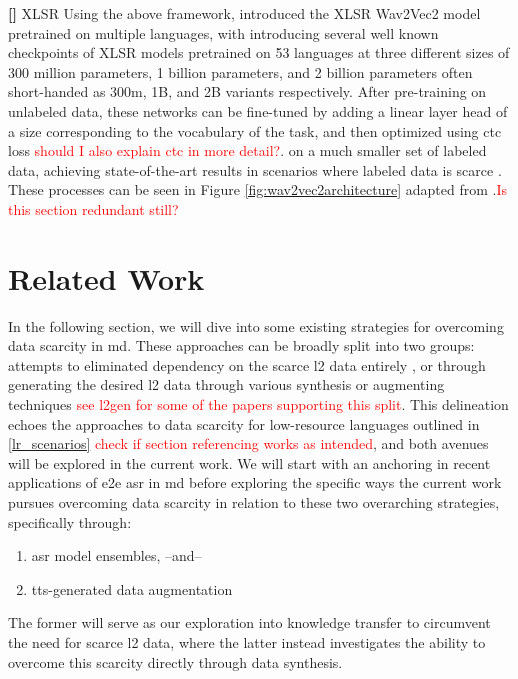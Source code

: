\documentclass[thesis]{cluu}
\newcounter{paranum}
\newcommand{\numberedparagraph}{\par\refstepcounter{paranum}\textbf{[\theparanum] }}
\newcommand{\todo}[1]{\textcolor{red}{#1}}
\begin{document}
\numberedparagraph{XLSR}
Using the above framework, \textcite{conneauUnsupervisedCrosslingualRepresentation2020} introduced the XLSR Wav2Vec2 model pretrained on multiple languages, with \textcite{babuXLSRSelfsupervisedCrosslingual2021} introducing several well known checkpoints of XLSR models pretrained on 53 languages at three different sizes of 300 million parameters, 1 billion parameters, and 2 billion parameters often short-handed as 300m, 1B, and 2B variants respectively. After pre-training on unlabeled data, these networks can be fine-tuned by adding a linear layer head of a size corresponding to the vocabulary of the task, and then optimized using \gls{ctc} loss \parencite{gravesConnectionistTemporalClassification} \todo{should I also explain ctc in more detail?}. on a much smaller set of labeled data, achieving state-of-the-art results in scenarios where labeled data is scarce \textcite{baevskiWav2vec20Framework2020a}. These processes can be seen in Figure \ref{fig:wav2vec2architecture} adapted from \textcite{babuXLSRSelfsupervisedCrosslingual2021}.\todo{Is this section redundant still?}


\chapter{Related Work}\label{ch:rw}
In the following section, we will dive into some existing strategies for overcoming data scarcity in \gls{md}. These approaches can be broadly split into two groups: attempts to eliminated dependency on the scarce \gls{l2} data entirely \parencite{korzekwaWeaklysupervisedWordlevelPronunciation2021}, or through generating the desired \gls{l2} data through various synthesis or augmenting techniques \todo{see l2gen for some of the papers supporting this split}. This delineation echoes the approaches to data scarcity for low-resource languages outlined in \ref{lr_scenarios} \todo{check if section referencing works as intended}, and both avenues will be explored in the current work. We will start with an anchoring in recent applications of \gls{e2e} \gls{asr} in \gls{md} before exploring the specific ways the current work pursues overcoming data scarcity in relation to these two overarching strategies, specifically through: 
\begin{enumerate}
  \item \gls{asr} model ensembles,
  --and--
  \item \gls{tts}-generated data augmentation
\end{enumerate}
The former will serve as our exploration into knowledge transfer to circumvent the need for scarce \gls{l2} data, where the latter instead investigates the ability to overcome this scarcity directly through data synthesis.
\end{document}
